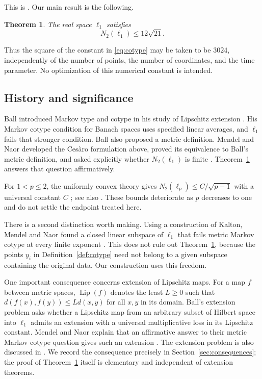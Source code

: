 \documentclass[11pt]{article}
\newtheorem{theorem}{Theorem}[section]
\theoremstyle{definition}
\theoremstyle{remark}
\numberwithin{equation}{section}
\DeclareMathOperator{\Lip}{Lip}
\begin{document}
This is \cite[Definition~1.2]{MendelNaor13}. Our main result is
the following.

\begin{theorem}\label{thm:main}
The real space $\ell_1$ satisfies
\[
 N_2(\ell_1)\leq12\sqrt{21}.
\]
\end{theorem}

Thus the square of the constant in \eqref{eq:cotype} may be taken
to be $3024$, independently of the number of points, the number of
coordinates, and the time parameter. No optimization of this
numerical constant is intended.

\subsection*{History and significance}
Ball introduced Markov type and cotype in his study of Lipschitz
extension \cite{Ball92}. His Markov cotype condition for Banach
spaces uses specified linear averages, and $\ell_1$ fails that
stronger condition. Ball also proposed a metric definition.
Mendel and Naor developed the Ces\`aro formulation above, proved
its equivalence to Ball's metric definition, and asked explicitly
whether $N_2(\ell_1)$ is finite
\cite[Question~1.15 and Section~7]{MendelNaor13}.
Theorem~\ref{thm:main} answers that question affirmatively.

For $1<p\leq2$, the uniformly convex theory gives
$N_2(\ell_p)\leq C/\sqrt{p-1}$ with a universal constant $C$
\cite{Ball92}; see also \cite[Section~1.1]{MendelNaor13}.
These bounds deteriorate as $p$ decreases to one and do not settle
the endpoint treated here.

There is a second distinction worth making. Using a construction
of Kalton, Mendel and Naor found a closed linear subspace of
$\ell_1$ that fails metric Markov cotype at every finite exponent
\cite[Theorem~1.14]{MendelNaor13}.
This does not rule out Theorem~\ref{thm:main}, because the points
$y_i$ in Definition~\ref{def:cotype} need not belong to a given
subspace containing the original data. Our construction uses
this freedom.

One important consequence concerns extension of Lipschitz maps.
For a map $f$ between metric spaces, $\Lip(f)$ denotes the least
$L\geq0$ such that $d(f(x),f(y))\leq Ld(x,y)$ for all $x,y$ in its
domain. Ball's extension problem asks whether a Lipschitz map from
an arbitrary subset of Hilbert space into $\ell_1$ admits an
extension with a universal multiplicative loss in its Lipschitz
constant. Mendel and Naor explain that an affirmative answer to
their metric Markov cotype question gives such an extension
\cite[Corollary~1.13 and the discussion after Question~1.15]{MendelNaor13}.
The extension problem is also discussed in
\cite[Section~1]{NaorYoung22}. We record the consequence precisely
in Section~\ref{sec:consequences}; the proof of
Theorem~\ref{thm:main} itself is elementary and independent of
extension theorems.
\end{document}
